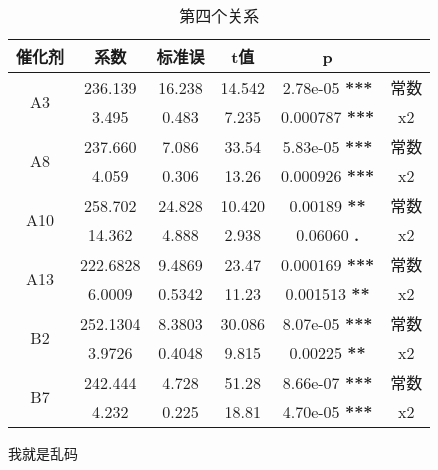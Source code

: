 \documentclass{article}
\begin{document}
\begin{table}
    \centering
    \caption{第四个关系}
    \begin{tabular}{c|c|c|c|c|c}
        \hline
        催化剂               & 系数     & 标准误 & t值    & p                     &      \\
        \hline
        \multirow{2}{*}{A3}  & 236.139  & 16.238 & 14.542 & 2.78e-05 \textbf{***} & 常数 \\
                             & 3.495    & 0.483  & 7.235  & 0.000787 \textbf{***} & x2   \\
        \hline
        \multirow{2}{*}{A8}  & 237.660  & 7.086  & 33.54  & 5.83e-05 \textbf{***} & 常数 \\
                             & 4.059    & 0.306  & 13.26  & 0.000926 \textbf{***} & x2   \\
        \hline
        \multirow{2}{*}{A10} & 258.702  & 24.828 & 10.420 & 0.00189 \textbf{**}   & 常数 \\
                             & 14.362   & 4.888  & 2.938  & 0.06060 \textbf{.}    & x2   \\
        \hline
        \multirow{2}{*}{A13} & 222.6828 & 9.4869 & 23.47  & 0.000169 \textbf{***} & 常数 \\
                             & 6.0009   & 0.5342 & 11.23  & 0.001513 \textbf{**}  & x2   \\
        \hline
        \multirow{2}{*}{B2} & 252.1304 & 8.3803 & 30.086 & 8.07e-05 \textbf{***} & 常数 \\
                             & 3.9726   & 0.4048 & 9.815  & 0.00225 \textbf{**}   & x2   \\
        \hline
        \multirow{2}{*}{B7} & 242.444  & 4.728  & 51.28  & 8.66e-07 \textbf{***} & 常数 \\
                             & 4.232    & 0.225  & 18.81  & 4.70e-05 \textbf{***} & x2   \\
        \hline
    \end{tabular}
\end{table}
\newpage
我就是乱码
\end{document}
